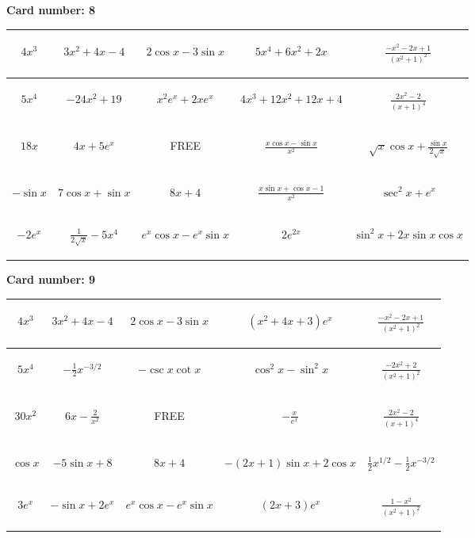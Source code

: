 \documentclass{article}
\newcommand{\entry}[1]{\begin{minipage}[t][2.75cm][t]{4cm} \vspace{1cm} \begin{center}#1\end{center} \end{minipage}}
\newcommand{\freespace}{\entry{FREE}}
\newcommand{\cardnumber}[1]{\noindent \textbf{Card number: #1} \bigskip}
\begin{document}
\pagebreak

\cardnumber{8}
\begin{center}
\begin{tabular}{|*{5}{c|}}
    \hline
    \entry{$4x^3$} & \entry{$3x^2 + 4x - 4$} & \entry{$2 \cos x - 3 \sin x$} & \entry{$5x^4 + 6x^2 + 2x$} & \entry{$\frac{-x^2 - 2x + 1}{(x^2 + 1)^2}$} \\ \hline
    \entry{$5x^4$} & \entry{$-24x^2 + 19$} & \entry{$x^2 e^x + 2x e^x$} & \entry{$4x^3 + 12x^2 + 12x + 4$} & \entry{$\frac{2x^2 - 2}{(x + 1)^4}$} \\ \hline
    \entry{$18x$} & \entry{$4x + 5e^x$} & \freespace & \entry{$\frac{x \cos x - \sin x}{x^2}$} & \entry{$\sqrt{x} \cos x + \frac{\sin x}{2 \sqrt{x}}$} \\ \hline
    \entry{$-\sin x$} & \entry{$7 \cos x + \sin x$} & \entry{$8x + 4$} & \entry{$\frac{x \sin x + \cos x - 1}{x^2}$} & \entry{$\sec^2 x + e^x$} \\ \hline
    \entry{$-2e^x$} & \entry{$\frac{1}{2\sqrt{x}} - 5x^4$} & \entry{$e^x \cos x - e^x \sin x$} & \entry{$2e^{2x}$} & \entry{$\sin^2 x + 2x \sin x \cos x$} \\ \hline
\end{tabular}
\end{center}

\pagebreak

\cardnumber{9}
\begin{center}
\begin{tabular}{|*{5}{c|}}
    \hline
    \entry{$4x^3$} & \entry{$3x^2 + 4x - 4$} & \entry{$2 \cos x - 3 \sin x$} & \entry{$(x^2 + 4x + 3) e^x$} & \entry{$\frac{-x^2 - 2x + 1}{(x^2 + 1)^2}$} \\ \hline
    \entry{$5x^4$} & \entry{$-\frac{1}{2} x^{-3/2}$} & \entry{$-\csc x \cot x$} & \entry{$\cos^2 x - \sin^2 x$} & \entry{$\frac{-2x^2 + 2}{(x^2 + 1)^2}$} \\ \hline
    \entry{$30x^2$} & \entry{$6x - \frac{2}{x^2}$} & \freespace & \entry{$-\frac{x}{e^x}$} & \entry{$\frac{2x^2 - 2}{(x + 1)^4}$} \\ \hline
    \entry{$\cos x$} & \entry{$-5 \sin x + 8$} & \entry{$8x + 4$} & \entry{$-(2x + 1) \sin x + 2 \cos x$} & \entry{$\frac{1}{2} x^{1/2} - \frac{1}{2} x^{-3/2}$} \\ \hline
    \entry{$3e^x$} & \entry{$-\sin x + 2e^x$} & \entry{$e^x \cos x - e^x \sin x$} & \entry{$(2x + 3) e^x$} & \entry{$\frac{1 - x^2}{(x^2 + 1)^2}$} \\ \hline
\end{tabular}
\end{center}
\end{document}

